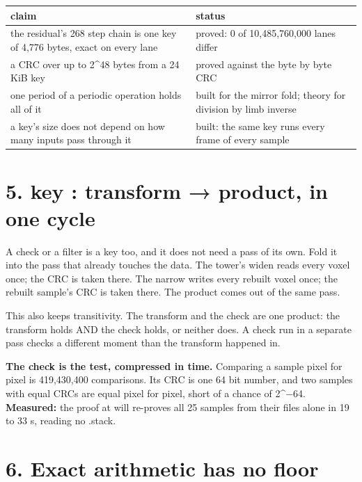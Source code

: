 {\small
\setlength{\tabcolsep}{6pt}
\begin{longtable}{>{\RaggedRight\arraybackslash}p{}>{\RaggedRight\arraybackslash}p{}}
\toprule
claim & status \\
\midrule
\endhead
the residual's 268 step chain is one key of 4,776 bytes, exact on every lane & proved: 0 of 10,485,760,000 lanes differ \\
a CRC over up to 2\textasciicircum{}48 bytes from a 24 KiB key & proved against the byte by byte CRC \\
one period of a periodic operation holds all of it & built for the mirror fold; theory for division by limb inverse \\
a key's size does not depend on how many inputs pass through it & built: the same key runs every frame of every sample \\
\bottomrule
\end{longtable}
}

\section{\texorpdfstring{5. key : transform → product, in one cycle}{5. key : transform → product, in one cycle}}

A check or a filter is a key too, and it does not need a pass of its own. Fold it into the pass that already touches the data. The tower's widen reads every voxel once; the CRC is taken there. The narrow writes every rebuilt voxel once; the rebuilt sample's CRC is taken there. The product comes out of the same pass.

This also keeps transitivity. The transform and the check are one product: the transform holds AND the check holds, or neither does. A check run in a separate pass checks a different moment than the transform happened in.

\textbf{The check is the test, compressed in time.} Comparing a sample pixel for pixel is 419,430,400 comparisons. Its CRC is one 64 bit number, and two samples with equal CRCs are equal pixel for pixel, short of a chance of 2\textasciicircum{}−64. \textbf{Measured:} the proof at will re-proves all 25 samples from their files alone in 19 to 33 s, reading no .stack.

\section{\texorpdfstring{6. Exact arithmetic has no floor}{6. Exact arithmetic has no floor}}

